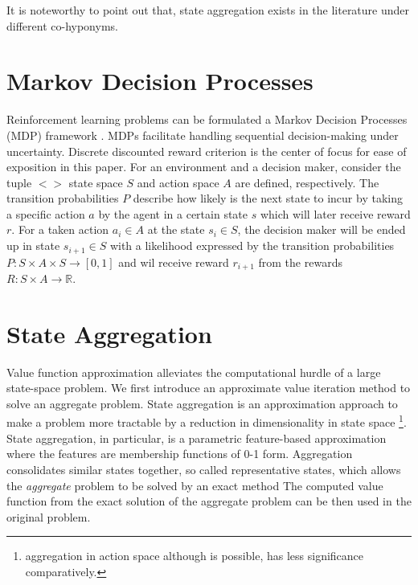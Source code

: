 \documentclass{article}
\begin{document}
    It is noteworthy to point out that, state aggregation exists in the literature under different co-hyponyms.
    


\section{Markov Decision Processes}
\label{sec:mdp}
    Reinforcement learning problems can be formulated a Markov Decision Processes (MDP)
    framework \cite{Puterman1994, Sutton1998}.
    MDPs facilitate handling sequential decision-making under uncertainty.
    Discrete discounted reward criterion is the center of focus for ease of exposition in this paper.
    For an environment and a decision maker, consider the tuple $<>$ state space $S$ and action space $A$ are defined,
respectively.
    The transition probabilities $P$ describe how likely is the next state to incur by taking a specific action
    $a$ by the agent in a certain state $s$ which will later receive reward $r$.
    For a taken action $a_i \in A$ at the state $s_i \in S$, the decision maker will be ended up in state $s_{i+1}
    \in S$ with a likelihood expressed by the transition probabilities $P : S \times A \times S \rightarrow [0, 1]$
    and wil receive reward $r_{i+1}$ from the rewards $R : S \times A \rightarrow \mathbb{R}$.

%


\section{State Aggregation}
\label{sec:state-aggregation}
    Value function approximation alleviates the computational hurdle of a large state-space problem.
    We first introduce an approximate value iteration method to solve an aggregate problem.
    State aggregation is an approximation approach to make a problem more tractable by a reduction in dimensionality in
    state space \footnote{aggregation in action space although is possible, has less significance comparatively.}.
    State aggregation, in particular, is a parametric feature-based approximation where the features are membership
    functions of 0-1 form.
    Aggregation consolidates similar states together, so called representative states, which allows the
    \textit{aggregate} problem to be solved by an exact method \cite{Bertsekas2019}
    The computed value function from the exact solution of the aggregate problem can be then used in the original
    problem.
\end{document}
